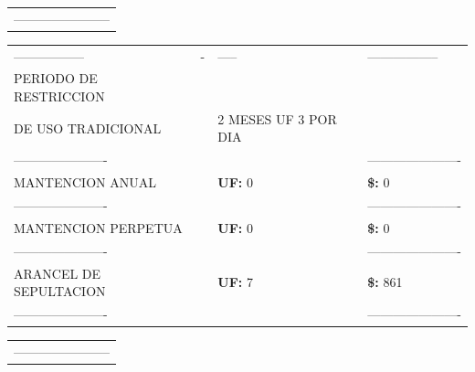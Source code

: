 \documentclass[10pt]{article}
\begin{document}
\begin{tabular}{l}
\color{white}----------------------- \\
\end{tabular}

\begin{tabular}{llll}
\hline
\color{white}----------------- & \color{white}- & \color{white}-----  & \color{white}----------------- \\
PERIODO DE RESTRICCION & & &\\ 
DE USO TRADICIONAL  & & 2 MESES UF 3 POR DIA \\ 
\color{white}---------------------- & & & \color{white}---------------------- \\
MANTENCION ANUAL &  & \textbf{UF: }0& \textbf{\$: }0 \\  
\color{white}---------------------- & & & \color{white}---------------------- \\
MANTENCION PERPETUA &  & \textbf{UF: }0 & \textbf{\$: }0 \\  
\color{white}---------------------- & & & \color{white}---------------------- \\
ARANCEL DE SEPULTACION &  & \textbf{UF: } 7& \textbf{\$: } 861 \\  
\color{white}---------------------- & & & \color{white}---------------------- \\
\hline
\end{tabular}

\begin{tabular}{l}
\color{white}----------------------- \\
\end{tabular}
\end{document}
